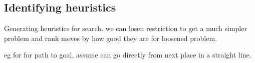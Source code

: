 
\subsection{Identifying heuristics}

Generating heuristics for search. we can losen restriction to get a much simpler problem and rank moves by how good they are for loosened problem.

eg for for path to goal, assume can go directly from next place in a straight line.
